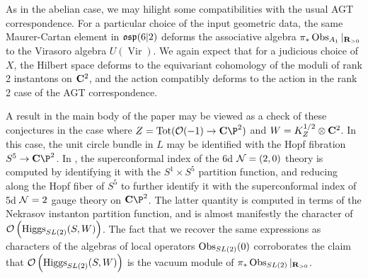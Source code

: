 As in the abelian case, we may hilight some compatibilities with the usual AGT correspondence. For a particular choice of the input geometric data, the same Maurer-Cartan element in $\mathfrak{osp}(6|2)$ deforms the associative algebra $\pi_{*}\operatorname{Obs}_{A_{1}}|_{\mathbf{R}_{>0}}$ to the Virasoro algebra $U(\operatorname{Vir})$. We again expect that for a judicious choice of $X$, the Hilbert space deforms to the equivariant cohomology of the moduli of rank 2 instantons on $\mathbf{C}^{2}$, and the action compatibly deforms to the action in the rank 2 case of the AGT correspondence.

A result in the main body of the paper may be viewed as a check of these conjectures in the case where $Z = \operatorname{Tot}(\cO(-1)\to \C\P^{2})$ and $W = K^{1/2}_{Z}\otimes \mathbf{C}^{2}$. In this case, the unit circle bundle in $L$ may be identified with the Hopf fibration $S^{5}\to \C\P^{2}$. In \cite{Kim:2013nva}, the superconformal index of the 6d $\mathcal N=(2,0)$ theory is computed by identifying it with the $S^{1}\times S^{5}$ partition function, and reducing along the Hopf fiber of $S^{5}$ to further identify it with the superconformal index of 5d $\mathcal N=2$ gauge theory on $\C\P^{2}$. The latter quantity is computed in terms of the Nekrasov instanton partition function, and is almost manifestly the character of $\mathcal O \left ( \operatorname{Higgs} _{SL(2)}(S, W)\right)$. The fact that we recover the same expressions as characters of the algebras of local operators $\operatorname{Obs}_{SL(2)}(0)$ corroborates the claim that $ \mathcal O \left ( \operatorname{Higgs} _{SL(2)}(S, W)\right)$ is the vacuum module of $\pi_{*}\operatorname{Obs}_{SL(2)}|_{\mathbf{R}_{>0}}$.





%
